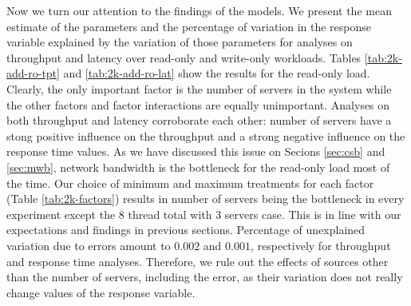 \documentclass[11pt,a4paper]{article}
\begin{document}
\par Now we turn our attention to the findings of the models. We present the mean estimate of the parameters and the percentage of variation in the response variable explained by the variation of those parameters for analyses on throughput and latency over read-only and write-only workloads. Tables \ref{tab:2k-add-ro-tpt} and \ref{tab:2k-add-ro-lat} show the results for the read-only load. Clearly, the only important factor is the number of servers in the system while the other factors and factor interactions are equally unimportant. Analyses on both throughput and latency corroborate each other: number of servers have a stong positive influence on the throughput and a strong negative influence on the response time values. As we have discussed this issue on Secions \ref{sec:csb} and \ref{sec:mwb}, network bandwidth is the bottleneck for the read-only load most of the time. Our choice of minimum and maximum treatments for each factor (Table \ref{tab:2k-factors}) results in number of servers being the bottleneck in every experiment except the 8 thread total with 3 servers case. This is in line with our expectations and findings in previous sections. Percentage of unexplained variation due to errors amount to $0.002$ and $0.001$, respectively for throughput and response time analyses. Therefore, we rule out the effects of sources other than the number of servers, including the error, as their variation does not really change values of the response variable.
\end{document}
